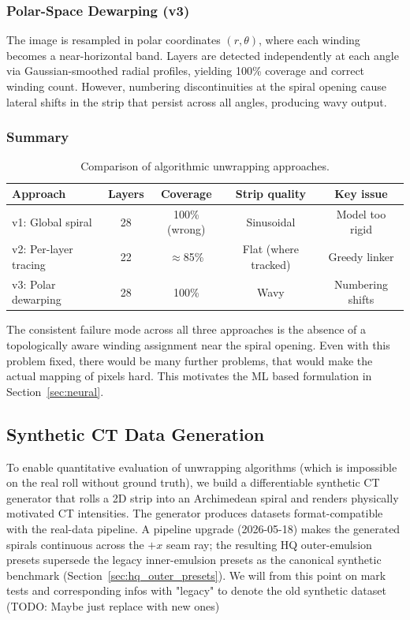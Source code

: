 \documentclass[11pt,a4paper]{article}
\begin{document}
\subsubsection{Polar-Space Dewarping (v3)}

The image is resampled in polar coordinates $(r, \theta)$, where each winding becomes a near-horizontal band. Layers are detected independently at each angle via Gaussian-smoothed radial profiles, yielding 100\% coverage and correct winding count. However, numbering discontinuities at the spiral opening cause lateral shifts in the strip that persist across all angles, producing wavy output.


\subsubsection{Summary}

\begin{table}[H]
\centering
\begin{tabular}{lcccc}
\toprule
Approach & Layers & Coverage & Strip quality & Key issue \\
\midrule
v1: Global spiral & 28 & 100\% (wrong) & Sinusoidal & Model too rigid \\
v2: Per-layer tracing & 22 & $\approx$85\% & Flat (where tracked) & Greedy linker \\
v3: Polar dewarping & 28 & 100\% & Wavy & Numbering shifts \\
\bottomrule
\end{tabular}
\caption{Comparison of algorithmic unwrapping approaches.}
\label{tab:algo_compare}
\end{table}

The consistent failure mode across all three approaches is the absence of a topologically aware winding assignment near the spiral opening. Even with this problem fixed, there would be many further problems, that would make the actual mapping of pixels hard. This motivates the ML based formulation in Section~\ref{sec:neural}.

\subsection{Synthetic CT Data Generation}
\label{sec:synthetic}

To enable quantitative evaluation of unwrapping algorithms (which is impossible on the real roll without ground truth), we build a differentiable synthetic CT generator that rolls a 2D strip into an Archimedean spiral and renders physically motivated CT intensities. The generator produces datasets format-compatible with the real-data pipeline. A pipeline upgrade (2026-05-18) makes the generated spirals continuous across the $+x$ seam ray; the resulting HQ outer-emulsion presets supersede the legacy inner-emulsion presets as the canonical synthetic benchmark (Section~\ref{sec:hq_outer_presets}). We will from this point on mark tests and corresponding infos with "legacy" to denote the old synthetic dataset (TODO: Maybe just replace with new ones)
\end{document}
